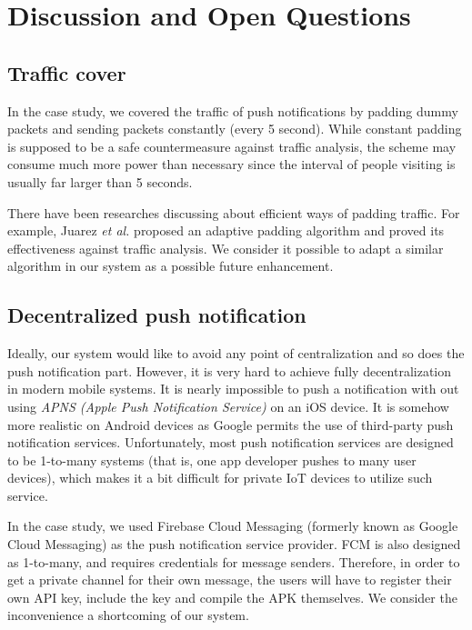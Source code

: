 \chapter{Discussion and Open Questions}

\section{Traffic cover}
\label{sec:traffic_cover}
In the case study, we covered the traffic of push notifications by padding dummy packets and sending packets constantly (every 5 second). While constant padding is supposed to be a safe countermeasure against traffic analysis, the scheme may consume much more power than necessary since the interval of people visiting is usually far larger than 5 seconds. 

There have been researches discussing about efficient ways of padding traffic. For example, Juarez \textit{et al.} \cite{juarez2016toward} proposed an adaptive padding algorithm and proved its effectiveness against traffic analysis. We consider it possible to adapt a similar algorithm in our system as a possible future enhancement.

\section{Decentralized push notification}
\label{sec:decentralized_push}
Ideally, our system would like to avoid any point of centralization and so does the push notification part. However, it is very hard to achieve fully decentralization in modern mobile systems. It is nearly impossible to push a notification with out using \textit{APNS (Apple Push Notification Service)} on an iOS device. It is somehow more realistic on Android devices as Google permits the use of third-party push notification services. Unfortunately, most push notification services are designed to be 1-to-many systems (that is, one app developer pushes to many user devices), which makes it a bit difficult for private IoT devices to utilize such service.

In the case study, we used Firebase Cloud Messaging (formerly known as Google Cloud Messaging) as the push notification service provider. FCM is also designed as 1-to-many, and requires credentials for message senders. Therefore, in order to get a private channel for their own message, the users will have to register their own API key, include the key and compile the APK themselves. We consider the inconvenience a shortcoming of our system.


